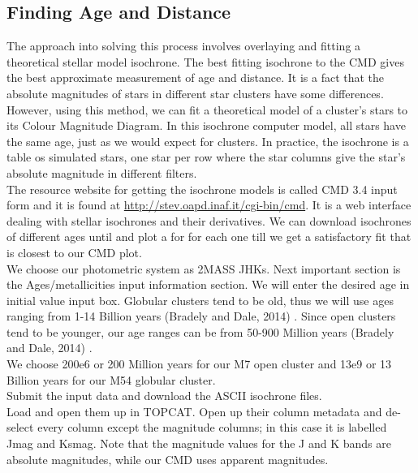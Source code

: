\documentclass[12pt]{article}
\begin{document}
		\pagebreak
		\subsection{Finding Age and Distance}
		The approach into solving this process involves overlaying and fitting a theoretical stellar model isochrone. The best fitting isochrone to the CMD gives the best approximate measurement of age and distance. It is a fact that the absolute magnitudes of stars in different star clusters have some differences. However, using this method, we can fit a theoretical model of a cluster's stars to its Colour Magnitude Diagram. In this isochrone computer model, all stars have the same age, just as we would expect for clusters. In practice, the isochrone is a table os simulated stars, one star per row where the star columns give the star's absolute magnitude in different filters.\\
		The resource website for getting the isochrone models is called CMD 3.4 input form and it is found at \url{http://stev.oapd.inaf.it/cgi-bin/cmd}. It is a web interface dealing with stellar isochrones and their derivatives. We can download isochrones of different ages until and plot a for for each one till we get a satisfactory fit that is closest to our CMD plot.\\
		We choose our photometric system as 2MASS JHKs. Next important section is the Ages/metallicities input information section. We will enter the desired age in initial value input box. Globular clusters tend to be old, thus we will use ages ranging from 1-14 Billion years (Bradely and Dale, 2014) \cite{bradley}. Since open clusters tend to be younger, our age ranges can be from 50-900 Million years (Bradely and Dale, 2014) \cite{bradley}.\\
		We choose 200e6 or 200 Million years for our M7 open cluster and 13e9 or 13 Billion years for our M54 globular cluster.\\
		Submit the input data and download the ASCII isochrone files.\\
		Load and open them up in TOPCAT. Open up their column metadata and de-select every column except the magnitude columns; in this case it is labelled Jmag and Ksmag. Note that the magnitude values for the J and K bands are absolute magnitudes, while our CMD uses apparent magnitudes.
\end{document}
